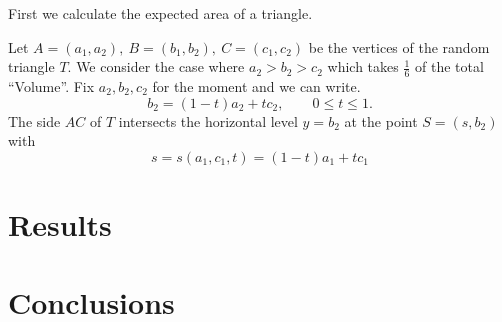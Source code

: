 \documentclass[10pt,twoside]{scrreprt}
\begin{document}
First we calculate the expected area of a triangle.

Let \( A = (a_1, a_2),\ B = (b_1, b_2),\ C = (c_1, c_2)\) be the vertices of the random triangle \( T \). We consider the case where \( a_2
> b_2 > c_2 \) which takes $\frac{1}{6}$ of the total ``Volume''. Fix \( a_2, b_2, c_2 \) for the moment and we can write.
\[
  b_2 = (1-t)a_2 + tc_2, \qquad 0 \leq t \leq 1.
\]
The side $AC$ of $T$ intersects the horizontal level $y=b_2$ at the point $S=(s,b_2)$ with
\begin{equation}
  s = s(a_1,c_1,t) = (1-t)a_1 + tc_1
\end{equation}
\chapter{Results}


\chapter{Conclusions} %
\label{cha:conclusions}


\printbibliography
\end{document}
